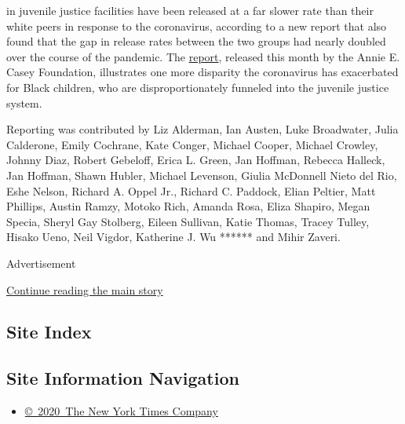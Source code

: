 \begin{itemize}
{  in juvenile justice facilities} have been released at a far slower
  rate than their white peers in response to the coronavirus, according
  to a new report that also found that the gap in release rates between
  the two groups had nearly doubled over the course of the pandemic. The
  \href{https://www.aecf.org/blog/youth-detention-admissions-remain-low-but-releases-stall-despite-covid-19/}{report},
  released this month by the Annie E. Casey Foundation, illustrates one
  more disparity the coronavirus has exacerbated for Black children, who
  are disproportionately funneled into the juvenile justice system.
\end{itemize}

Reporting was contributed by Liz Alderman, Ian Austen, Luke Broadwater,
Julia Calderone, Emily Cochrane, Kate Conger, Michael Cooper, Michael
Crowley, Johnny Diaz, Robert Gebeloff, Erica L. Green, Jan Hoffman,
Rebecca Halleck, Jan Hoffman, Shawn Hubler, Michael Levenson, Giulia
McDonnell Nieto del Rio, Eshe Nelson, Richard A. Oppel Jr., Richard C.
Paddock, Elian Peltier, Matt Phillips, Austin Ramzy, Motoko Rich, Amanda
Rosa, Eliza Shapiro, Megan Specia, Sheryl Gay Stolberg, Eileen Sullivan,
Katie Thomas, Tracey Tulley, Hisako Ueno, Neil Vigdor, Katherine J. Wu
****** and Mihir Zaveri.

Advertisement

\protect\hyperlink{after-bottom}{Continue reading the main story}

\hypertarget{site-index}{%
\subsection{Site Index}\label{site-index}}

\hypertarget{site-information-navigation}{%
\subsection{Site Information
Navigation}\label{site-information-navigation}}

\begin{itemize}
\tightlist
\item
  \href{https://help.nytimes3xbfgragh.onion/hc/en-us/articles/115014792127-Copyright-notice}{©~2020~The
  New York Times Company}
\end{itemize}

